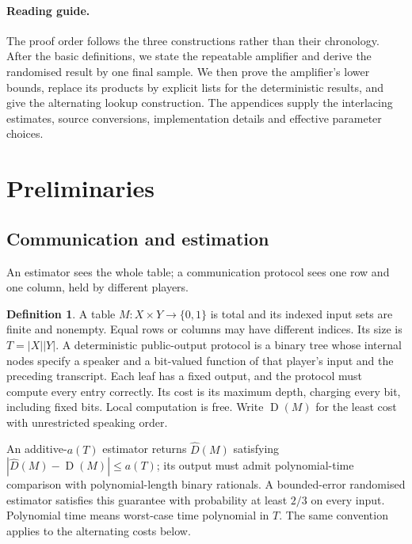 \documentclass[11pt]{article} \usepackage[utf8]{inputenc}
\theoremstyle{plain} \newtheorem{theorem}{Theorem}[section]
\theoremstyle{definition} \newaliascnt{definition}{theorem}
\newtheorem{definition}[definition]{Definition} \aliascntresetthe{definition}
\newcommand{\D}{\operatorname{D}}
\begin{document}
\paragraph{Reading guide.}
The proof order follows the three constructions rather than their chronology.
After the basic definitions, we state the repeatable amplifier and derive
the randomised result by one final sample. We then prove the amplifier's
lower bounds, replace its products by explicit lists for the deterministic
results, and give the alternating lookup construction. The appendices
supply the interlacing estimates, source conversions, implementation details
and effective parameter choices.

\section{Preliminaries}
\label{sec:models}

\subsection{Communication and estimation}

An estimator sees the whole table; a communication protocol sees one row
and one column, held by different players.

\begin{definition}\label{def:table-estimation}
A table $M:X\times Y\to\{0,1\}$ is total and its indexed input sets are
finite and nonempty. Equal rows or columns may have different indices.
Its size is $T=|X||Y|$.
A deterministic public-output protocol is a binary tree whose internal
nodes specify a speaker and a bit-valued function of that player's input
and the preceding transcript. Each leaf has a fixed output, and the
protocol must compute every entry correctly. Its cost is its maximum
depth, charging every bit, including fixed bits. Local computation is free.
Write $\D(M)$ for the least cost with unrestricted speaking order.

An additive-$a(T)$ estimator returns $\widehat D(M)$ satisfying
$|\widehat D(M)-\D(M)|\le a(T)$; its output must admit polynomial-time
comparison with polynomial-length binary rationals. A bounded-error
randomised estimator satisfies this guarantee with probability at least
$2/3$ on every input. Polynomial time means worst-case time polynomial
in $T$. The same convention applies to the alternating costs below.
\end{definition}
\end{document}
